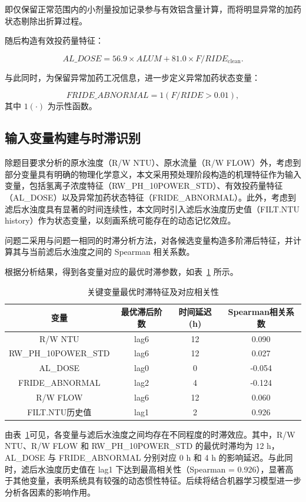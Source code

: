 \documentclass[UTF8,zihao=-4]{ctexart}
\begin{document}
即仅保留正常范围内的小剂量投加记录参与有效铝含量计算，而将明显异常的加药状态剔除出折算过程。

随后构造有效投药量特征：

\[
AL\_DOSE
=
56.9\times ALUM
+
81.0\times F/RIDE_{\mathrm{clean}}.
\]

与此同时，为保留异常加药工况信息，进一步定义异常加药状态变量：

\[
FRIDE\_ABNORMAL
=
1(F/RIDE>0.01),
\]
其中 \(1(\cdot)\) 为示性函数。

\subsection{输入变量构建与时滞识别}
除题目要求分析的原水浊度（R/W NTU）、原水流量（R/W FLOW）外，考虑到部分变量具有明确的物理化学意义，本文采用预处理阶段构造的机理特征作为输入变量，包括氢离子浓度特征（RW\_PH\_10POWER\_STD）、有效投药量特征（AL\_DOSE）以及异常加药状态特征（FRIDE\_ABNORMAL）。此外，考虑到滤后水浊度具有显著的时间连续性，本文同时引入滤后水浊度历史值（FILT.NTU history）作为状态变量，以刻画系统可能存在的动态记忆效应。

问题二采用与问题一相同的时滞分析方法，对各候选变量构造多阶滞后特征，并计算其与当前滤后水浊度之间的 Spearman 相关系数。

根据分析结果，得到各变量对应的最优时滞参数，如表~\ref{tab:p2_lag} 所示。

\begin{table}[H]
\centering
\caption{关键变量最优时滞特征及对应相关性}
\label{tab:p2_lag}
\begin{tabular}{cccc}
\toprule
变量 & 最优滞后阶数 & 时间延迟(h) & Spearman相关系数\\
\midrule
R/W NTU & lag6 & 12 & 0.090\\
RW\_PH\_10POWER\_STD & lag6 & 12 & 0.027\\
AL\_DOSE & lag0 & 0 & -0.054\\
FRIDE\_ABNORMAL & lag2 & 4 & -0.124\\
R/W FLOW & lag6 & 12 & 0.060\\
FILT.NTU历史值 & lag1 & 2 & 0.926\\
\bottomrule
\end{tabular}
\end{table}

由表~\ref{tab:p2_lag}可见，各变量与滤后水浊度之间均存在不同程度的时滞效应。其中，R/W NTU、R/W FLOW 和 RW\_PH\_10POWER\_STD 的最优时滞均为 12 h，AL\_DOSE 与 FRIDE\_ABNORMAL 分别对应 0 h 和 4 h 的影响延迟。与此同时，滤后水浊度历史值在 lag1 下达到最高相关性（Spearman = 0.926），显著高于其他变量，表明系统具有较强的动态惯性特征。后续将结合机器学习模型进一步分析各因素的影响作用。
\end{document}
